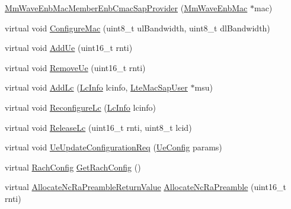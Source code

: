 \begin{DoxyCompactItemize}
\item 
\hyperlink{classns3_1_1MmWaveEnbMacMemberEnbCmacSapProvider_ab468c88689bd279cfc78611024cd8967}{Mm\+Wave\+Enb\+Mac\+Member\+Enb\+Cmac\+Sap\+Provider} (\hyperlink{classns3_1_1MmWaveEnbMac}{Mm\+Wave\+Enb\+Mac} $\ast$mac)
\item 
virtual void \hyperlink{classns3_1_1MmWaveEnbMacMemberEnbCmacSapProvider_a5297b007fa1aff276f4502162da783bc}{Configure\+Mac} (uint8\+\_\+t ul\+Bandwidth, uint8\+\_\+t dl\+Bandwidth)
\item 
virtual void \hyperlink{classns3_1_1MmWaveEnbMacMemberEnbCmacSapProvider_a859e1e95a116f15d0a0a19918e48d05b}{Add\+Ue} (uint16\+\_\+t rnti)
\item 
virtual void \hyperlink{classns3_1_1MmWaveEnbMacMemberEnbCmacSapProvider_a2e9dc1facd005f528bad8186513471ca}{Remove\+Ue} (uint16\+\_\+t rnti)
\item 
virtual void \hyperlink{classns3_1_1MmWaveEnbMacMemberEnbCmacSapProvider_a4936ed894634e762b00db661bce618bf}{Add\+Lc} (\hyperlink{structns3_1_1LteEnbCmacSapProvider_1_1LcInfo}{Lc\+Info} lcinfo, \hyperlink{classns3_1_1LteMacSapUser}{Lte\+Mac\+Sap\+User} $\ast$msu)
\item 
virtual void \hyperlink{classns3_1_1MmWaveEnbMacMemberEnbCmacSapProvider_a40495d3ced0ccdd583b52e3a3211a6c0}{Reconfigure\+Lc} (\hyperlink{structns3_1_1LteEnbCmacSapProvider_1_1LcInfo}{Lc\+Info} lcinfo)
\item 
virtual void \hyperlink{classns3_1_1MmWaveEnbMacMemberEnbCmacSapProvider_aca1791cf2951973fb481169d100773e5}{Release\+Lc} (uint16\+\_\+t rnti, uint8\+\_\+t lcid)
\item 
virtual void \hyperlink{classns3_1_1MmWaveEnbMacMemberEnbCmacSapProvider_a0ec4e66c101b6c49927737caab928d77}{Ue\+Update\+Configuration\+Req} (\hyperlink{structns3_1_1LteEnbCmacSapProvider_1_1UeConfig}{Ue\+Config} params)
\item 
virtual \hyperlink{structns3_1_1LteEnbCmacSapProvider_1_1RachConfig}{Rach\+Config} \hyperlink{classns3_1_1MmWaveEnbMacMemberEnbCmacSapProvider_ab1d4f8f84a615b7351c70896c2114a87}{Get\+Rach\+Config} ()
\item 
virtual \hyperlink{structns3_1_1LteEnbCmacSapProvider_1_1AllocateNcRaPreambleReturnValue}{Allocate\+Nc\+Ra\+Preamble\+Return\+Value} \hyperlink{classns3_1_1MmWaveEnbMacMemberEnbCmacSapProvider_a4356a131b9d7b30c9653751500eaf8f7}{Allocate\+Nc\+Ra\+Preamble} (uint16\+\_\+t rnti)
\end{DoxyCompactItemize}
